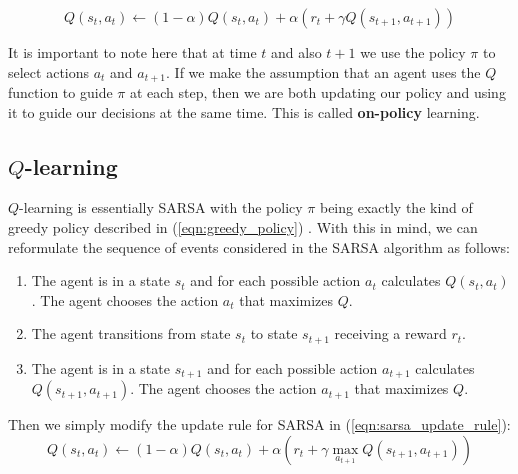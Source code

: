 \documentclass[journal, onecolumn, 12pt, draftclsnofoot]{IEEEtran}
\newcommand{\kword}[1]{\textbf{#1}}
\begin{document}
		\begin{equation}
			\label{eqn:sarsa_update_rule}
			Q(s_t, a_t) \gets (1 - \alpha) Q(s_t, a_t) + \alpha (
			r_t + \gamma Q(s_{t+1}, a_{t+1}))
		\end{equation}
		\par It is important to note here that at time $t$ and also $t+1$ we use the policy $\pi$ to select actions $a_t$ and $a_{t+1}$. If we make the assumption that an agent uses the $Q$ function to guide $\pi$ at each step, then we are both updating our policy and using it to guide our decisions at the same time. This is called \kword{on-policy} learning.
		\subsection{$Q$-learning}
		\par $Q$-learning is essentially SARSA with the policy $\pi$ being exactly the kind of greedy policy described in (\ref{eqn:greedy_policy}) \cite{rl}. With this in mind, we can reformulate the sequence of events considered in the SARSA algorithm as follows:
		\begin{enumerate}
			\item The agent is in a state $s_t$ and for each possible action $a_t$ calculates $Q(s_t, a_t)$. The agent chooses the action $a_t$ that maximizes $Q$.
			\item The agent transitions from state $s_t$ to state $s_{t+1}$ receiving a reward $r_t$.
			\item The agent is in a state $s_{t+1}$ and for each possible action $a_{t+1}$ calculates $Q(s_{t+1}, a_{t+1})$. The agent chooses the action $a_{t+1}$ that maximizes $Q$.
		\end{enumerate}
		Then we simply modify the update rule for SARSA in (\ref{eqn:sarsa_update_rule}):
		\begin{equation}
			\label{eqn:q_update_rule}
			Q(s_t, a_t) \gets (1 - \alpha) Q(s_t, a_t) + \alpha (
			r_t + \gamma \max_{a_{t+1}} Q(s_{t+1}, a_{t+1}))
		\end{equation}
\end{document}
